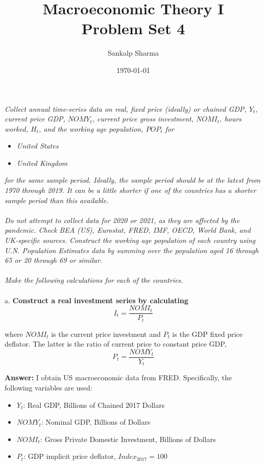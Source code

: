 \documentclass[12pt]{article}
\title{\textbf{Macroeconomic Theory I \\ Problem Set 4}}
\author{Sankalp Sharma}
\date{\today}
\theoremstyle{mytheoremstyle}
\theoremstyle{mytheoremstyle}
\theoremstyle{myproblemstyle}
\begin{document}
    \maketitle

\noindent \textit{Collect annual time-series data on real, fixed price (ideally) or chained GDP, $Y_t$, current price GDP, $NOMY_t$, current price gross investment, $NOMI_t$, hours worked, $H_t$, and the working age population, $POP_t$ for}

\begin{itemize}
    \item \textit{United States}
    \item \textit{United Kingdom }
\end{itemize}

\noindent \textit{for the same sample period. Ideally, the sample period should be at the latest from 1970 through 2019. It can be a little shorter if one of the countries has a shorter sample period than this available.}
\\
\\    
\textit{Do not attempt to collect data for 2020 or 2021, as they are affected by the pandemic. Check BEA (US), Eurostat, FRED, IMF, OECD, World Bank, and UK-specific sources. Construct the working age population of each country using U.N. Population Estimates data by summing over the population aged 16 through 65 or 20 through 69 or similar.}
\\
\\
\textit{Make the following calculations for each of the countries.}
\\
\\
a. \textbf{Construct a real investment series by calculating} $$I_t = \frac{NOMI_t}{P_t}$$

where $NOMI_t$ is the current price investment and $P_t$ is the GDP fixed price deflator. The latter is the ratio of current price to constant price GDP, $$ P_t = \frac{NOMY_t}{Y_t}$$

\textbf{Answer:} I obtain US macroeconomic data from FRED. Specifically, the following variables are used:
\begin{itemize}
    \item $Y_t$: Real GDP, Billions of Chained 2017 Dollars
    \item $NOMY_t$: Nominal GDP, Billions of Dollars
    \item $NOMI_t$: Gross Private Domestic Investment, Billions of Dollars
    \item $P_t$: GDP implicit price deflator, $Index_{2017} = 100$
\end{itemize}
\end{document}
